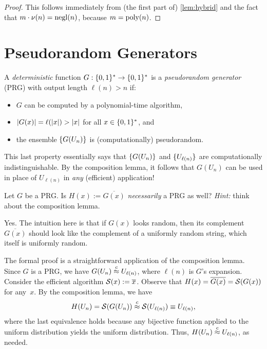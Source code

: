 \documentclass[11pt]{article}
\begin{document}
\begin{proof}
  This follows immediately from (the first part of) \cref{lem:hybrid} and the fact that $m \cdot \nu(n) = \operatorname{negl}(n)$, because $m = \operatorname{poly}(n)$.
\end{proof}

\section{Pseudorandom Generators}
\label{sec:prgs}

\begin{definition}
  \label{def:prg}
  A \emph{deterministic} function $G : \{0,1\}^{*} \to \{0,1\}^{*}$ is a
  \emph{pseudorandom generator} (PRG) with output length $\ell(n) > n$
  if:
  \begin{itemize}
  \item $G$ can be computed by a polynomial-time algorithm,
  \item $\lvert G(x)\rvert = \ell(\lvert x\rvert) > \lvert x\rvert$ for all
    $x \in \{0,1\}^{*}$, and
  \item the ensemble $\{G(U_{n})\}$ is (computationally)
    pseudorandom.
  \end{itemize}
  
  This last property essentially says that $\{G(U_{n})\}$ and
  $\{U_{\ell(n)}\}$ are computationally indistinguishable. By the
  composition lemma, it follows that $G(U_{n})$ can be used in place
  of $U_{\ell(n)}$ in \emph{any} (efficient) application!
\end{definition}

\begin{question}
  Let \(G\) be a PRG. Is \(H(x) := \overline{G(x)}\)
  \emph{necessarily} a PRG as well?  \emph{Hint:} think about the
  composition lemma.
\end{question}
  
\begin{answer}
  Yes. The intuition here is that if \(G(x)\) looks random, then its
  complement \(\overline{G(x)}\) should look like the complement of a
  uniformly random string, which itself is uniformly random.

  The formal proof is a straightforward application of the composition
  lemma. Since \(G\) is a PRG, we have
  \(G(U_n) \stackrel{c}{\approx} U_{\ell(n)}\), where $\ell(n)$ is $G$'s
  expansion. Consider the efficient algorithm
  \(\mathcal{S}(x) := \overline{x}\). Observe that
  \(H(x) = \overline{G(x)} = \mathcal{S}(G(x))\) for any~$x$. By the
  composition lemma, we have
  \[ H(U_{n}) = \mathcal{S}(G(U_n)) \stackrel{c}{\approx} \mathcal{S}(U_{\ell(n)}) \equiv
    U_{\ell(n)}, \] where the last equivalence holds because any
  bijective function applied to the uniform distribution yields the
  uniform distribution. Thus, \(H(U_n) \stackrel{c}{\approx} U_{\ell(n)}\), as
  needed.
\end{answer}
\end{document}
